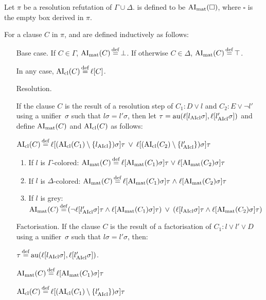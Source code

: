 \documentclass[,%
	draft=false,%
	numbers=noendperiod
	oneside,openany
	a4paper,
	11pt,
]{memoir}
\begin{document}
\begin{defi}
	Let $\pi$ be a resolution refutation of $\Gamma \cup \Delta$.
	 is defined to be $\operatorname{AI}_\mathrm{mat}(\square)$, where $\square$ is the empty box derived in $\pi$.

	For a clause $C$ in $\pi$,  and  are defined inductively as follows:
	\begin{itemize}
		\item[Base case.]
			If $C \in \Gamma$, $\operatorname{AI}_\mathrm{mat}(C) \operatorname{\stackrel{\mathrm{def}}{=}} \bot$.
			If otherwise $C \in \Delta$, $\operatorname{AI}_\mathrm{mat}(C) \operatorname{\stackrel{\mathrm{def}}{=}} \top$.

			In any case, $\operatorname{AI}_\mathrm{cl}(C) \operatorname{\stackrel{\mathrm{def}}{=}} \ell[C]$.
		\item[Resolution.]

			If the clause $C$ is the result of a resolution step of $C_1: D \lor l$ and $C_2: E \lor \lnot l'$ using a unifier~$\sigma$ such that $l\sigma = l'\sigma$, 
			then 
			let $\tau = \operatorname{au}(\ell[l_{\operatorname{AIcl}}\sigma], \ell[l'_{\operatorname{AIcl}}\sigma])$ and define
			$\operatorname{AI}_\mathrm{mat}(C)$ and $\operatorname{AI}_\mathrm{cl}(C)$ as follows:

			$\operatorname{AI}_\mathrm{cl}(C) \operatorname{\stackrel{\mathrm{def}}{=}} \ell[(\operatorname{AI}_\mathrm{cl}(C_1) \setminus \{l_{\operatorname{AIcl}}\})\sigma]\tau \;\,{\lor}\;\, \ell[(\operatorname{AI}_\mathrm{cl}(C_2)\setminus \{l_{\operatorname{AIcl}}'\})\sigma]\tau $
			\begin{enumerate}

				\item If $l$ is $\Gamma$-colored:
					$\operatorname{AI}_\mathrm{mat}(C) \operatorname{\stackrel{\mathrm{def}}{=}} \ell[\operatorname{AI}_\mathrm{mat}(C_1)\sigma]\tau\;{\lor}\; \ell[\operatorname{AI}_\mathrm{mat}(C_2)\sigma]\tau $

				\item If $l$ is $\Delta$-colored:
					$\operatorname{AI}_\mathrm{mat}(C) \operatorname{\stackrel{\mathrm{def}}{=}} \ell[\operatorname{AI}_\mathrm{mat}(C_1)\sigma]\tau\;{\land}\; \ell[\operatorname{AI}_\mathrm{mat}(C_2)\sigma]\tau $

				\item If $l$ is grey:
					$\operatorname{AI}_\mathrm{mat}(C) \operatorname{\stackrel{\mathrm{def}}{=}}
					(\lnot {\ell[l'\ensuremath{_{\operatorname{AIcl}}}\sigma]}\tau \land \ell[\operatorname{AI}_\mathrm{mat}(C_1)\sigma]\tau) \;\,{\lor}\;\,
					(\ell[l_{\operatorname{AIcl}}\sigma]\tau \land \ell[\operatorname{AI}_\mathrm{mat}(C_2)\sigma]\tau)
					$

			\end{enumerate}

		\item[Factorisation.]
			If the clause $C$ is the result of a factorisation of $C_1: l \lor l' \lor D$ using a unifier~$\sigma$ such that $l\sigma = l'\sigma$, then:

			$\tau \operatorname{\stackrel{\mathrm{def}}{=}} \operatorname{au}(\ell[l_{\operatorname{AIcl}}\sigma], \ell[l'_{\operatorname{AIcl}}\sigma])$.

			$\operatorname{AI}_\mathrm{mat}(C) \operatorname{\stackrel{\mathrm{def}}{=}}{} \ell[\operatorname{AI}_\mathrm{mat}(C_1)\sigma]\tau$

			$\AIcl(C) \defeq \lifboth{ (\AIclause(C_1) \setminus\nolinebreak \{l'\cl\})\sigma}\tau$
			\qedhere

	\end{itemize}
\end{defi}
\end{document}
